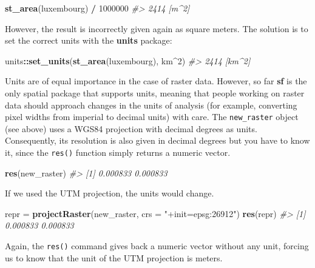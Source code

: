 \documentclass[]{krantz}
\newenvironment{Shaded}{\begin{snugshade}}{\end{snugshade}}
\newcommand{\CommentTok}[1]{\textcolor[rgb]{0.37,0.37,0.37}{\textit{#1}}}
\newcommand{\DataTypeTok}[1]{\textcolor[rgb]{0.27,0.27,0.27}{#1}}
\newcommand{\DecValTok}[1]{\textcolor[rgb]{0.06,0.06,0.06}{#1}}
\newcommand{\KeywordTok}[1]{\textcolor[rgb]{0.27,0.27,0.27}{\textbf{#1}}}
\newcommand{\NormalTok}[1]{#1}
\newcommand{\OperatorTok}[1]{\textcolor[rgb]{0.43,0.43,0.43}{\textbf{#1}}}
\newcommand{\StringTok}[1]{\textcolor[rgb]{0.5,0.5,0.5}{#1}}
\begin{document}
\begin{Shaded}
\begin{Highlighting}[]
\KeywordTok{st_area}\NormalTok{(luxembourg) }\OperatorTok{/}\StringTok{ }\DecValTok{1000000}
\CommentTok{#> 2414 [m^2]}
\end{Highlighting}
\end{Shaded}

However, the result is incorrectly given again as square meters.
The solution is to set the correct units with the \textbf{units} package:

\begin{Shaded}
\begin{Highlighting}[]
\NormalTok{units}\OperatorTok{::}\KeywordTok{set_units}\NormalTok{(}\KeywordTok{st_area}\NormalTok{(luxembourg), km}\OperatorTok{^}\DecValTok{2}\NormalTok{)}
\CommentTok{#> 2414 [km^2]}
\end{Highlighting}
\end{Shaded}

Units are of equal importance in the case of raster data.
However, so far \textbf{sf} is the only spatial package that supports units, meaning that people working on raster data should approach changes in the units of analysis (for example, converting pixel widths from imperial to decimal units) with care.
The \texttt{new\_raster} object (see above) uses a WGS84 projection with decimal degrees as units.
Consequently, its resolution is also given in decimal degrees but you have to know it, since the \texttt{res()} function simply returns a numeric vector.

\begin{Shaded}
\begin{Highlighting}[]
\KeywordTok{res}\NormalTok{(new_raster)}
\CommentTok{#> [1] 0.000833 0.000833}
\end{Highlighting}
\end{Shaded}

If we used the UTM projection, the units would change.

\begin{Shaded}
\begin{Highlighting}[]
\NormalTok{repr =}\StringTok{ }\KeywordTok{projectRaster}\NormalTok{(new_raster, }\DataTypeTok{crs =} \StringTok{"+init=epsg:26912"}\NormalTok{)}
\KeywordTok{res}\NormalTok{(repr)}
\CommentTok{#> [1] 0.000833 0.000833}
\end{Highlighting}
\end{Shaded}

Again, the \texttt{res()} command gives back a numeric vector without any unit, forcing us to know that the unit of the UTM projection is meters.
\end{document}
